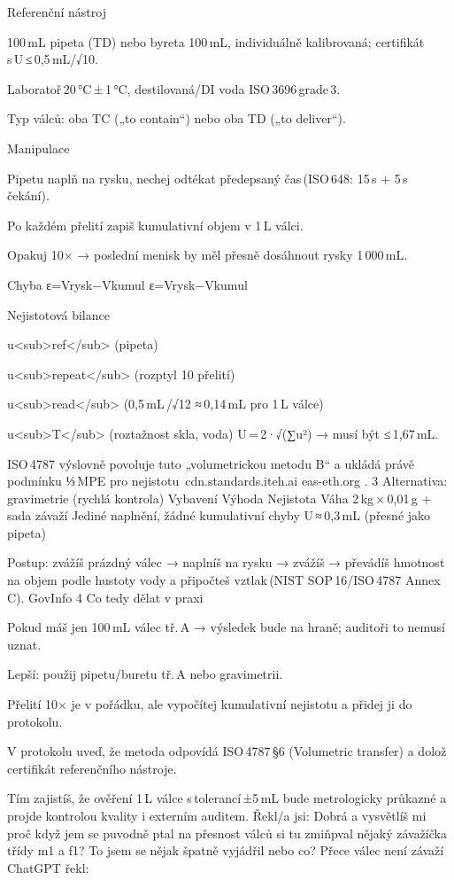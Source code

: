     Referenční nástroj

        100 mL pipeta (TD) nebo byreta 100 mL, individuálně kalibrovaná; certifikát s U ≤ 0,5 mL/√10.

    Laboratoř 20 °C ± 1 °C, destilovaná/DI voda ISO 3696 grade 3.

    Typ válců: oba TC („to contain“) nebo oba TD („to deliver“).

    Manipulace

        Pipetu naplň na rysku, nechej odtékat předepsaný čas (ISO 648: 15 s + 5 s čekání).

        Po každém přelití zapiš kumulativní objem v 1 L válci.

    Opakuj 10× → poslední menisk by měl přesně dosáhnout rysky 1 000 mL.

    Chyba
    ε=Vrysk−Vkumul
    ε=Vrysk​−Vkumul​

    Nejistotová bilance

        u<sub>ref</sub> (pipeta)

        u<sub>repeat</sub> (rozptyl 10 přelití)

        u<sub>read</sub> (0,5 mL /√12 ≈ 0,14 mL pro 1 L válce)

        u<sub>T</sub> (roztažnost skla, voda)
        U = 2·√(∑u²) → musí být ≤ 1,67 mL.

ISO 4787 výslovně povoluje tuto „volumetrickou metodu B“ a ukládá právě podmínku ⅓ MPE pro nejistotu 
cdn.standards.iteh.ai
eas-eth.org
.
3  Alternativa: gravimetrie (rychlá kontrola)
Vybavení	Výhoda	Nejistota
Váha 2 kg × 0,01 g + sada závaží	Jediné naplnění, žádné kumulativní chyby	U ≈ 0,3 mL (přesné jako pipeta)

Postup: zvážíš prázdný válec → naplníš na rysku → zvážíš → převádíš hmotnost na objem podle hustoty vody a připočteš vztlak (NIST SOP 16/ISO 4787 Annex C). 
GovInfo
4  Co tedy dělat v praxi

    Pokud máš jen 100 mL válec tř. A → výsledek bude na hraně; auditoři to nemusí uznat.

    Lepší: použij pipetu/buretu tř. A nebo gravimetrii.

    Přelití 10× je v pořádku, ale vypočítej kumulativní nejistotu a přidej ji do protokolu.

    V protokolu uveď, že metoda odpovídá ISO 4787 §6 (Volumetric transfer) a dolož certifikát referenčního nástroje.

Tím zajistíš, že ověření 1 L válce s tolerancí ±5 mL bude metrologicky průkazné a projde kontrolou kvality i externím auditem.
Řekl/a jsi:
Dobrá a vysvětlíš mi proč když jem se puvodně ptal na přesnost válců si tu zmiňpval nějaký závažíčka třídy m1 a f1? To jsem se nějak špatně vyjádřil nebo co? Přece válec není závaží
ChatGPT řekl:

